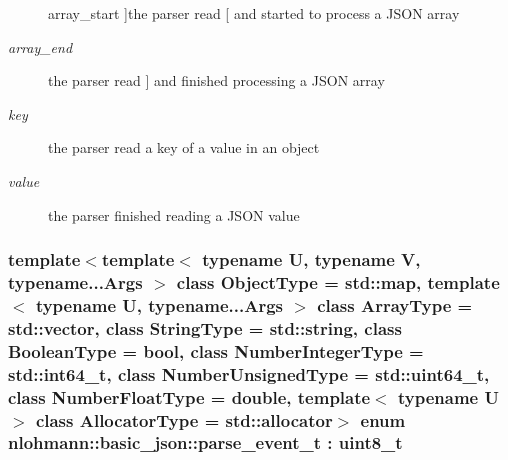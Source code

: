 \begin{Desc}
\begin{description}
{\hypertarget{classnlohmann_1_1basic__json_aea1c863b719b4ca5b77188c171bbfafeaa4388a3d92419edbb1c6efd4d52461f3}{array\-\_\-start}\label{classnlohmann_1_1basic__json_aea1c863b719b4ca5b77188c171bbfafeaa4388a3d92419edbb1c6efd4d52461f3}
}]the parser read {\ttfamily \mbox{[}} and started to process a J\-S\-O\-N array \item[{\em 
\hypertarget{classnlohmann_1_1basic__json_aea1c863b719b4ca5b77188c171bbfafea49642fb732aa2e112188fba1f9d3ef7f}{array\-\_\-end}\label{classnlohmann_1_1basic__json_aea1c863b719b4ca5b77188c171bbfafea49642fb732aa2e112188fba1f9d3ef7f}
}]the parser read {\ttfamily \mbox{]}} and finished processing a J\-S\-O\-N array \item[{\em 
\hypertarget{classnlohmann_1_1basic__json_aea1c863b719b4ca5b77188c171bbfafea3c6e0b8a9c15224a8228b9a98ca1531d}{key}\label{classnlohmann_1_1basic__json_aea1c863b719b4ca5b77188c171bbfafea3c6e0b8a9c15224a8228b9a98ca1531d}
}]the parser read a key of a value in an object \item[{\em 
\hypertarget{classnlohmann_1_1basic__json_aea1c863b719b4ca5b77188c171bbfafea2063c1608d6e0baf80249c42e2be5804}{value}\label{classnlohmann_1_1basic__json_aea1c863b719b4ca5b77188c171bbfafea2063c1608d6e0baf80249c42e2be5804}
}]the parser finished reading a J\-S\-O\-N value \end{description}
\end{Desc}
\hypertarget{classnlohmann_1_1basic__json_aea1c863b719b4ca5b77188c171bbfafe}{
\subsubsection[{parse\-\_\-event\-\_\-t}]{\setlength{\rightskip}{0pt plus 5cm}template$<$template$<$ typename U, typename V, typename...\-Args $>$ class Object\-Type = std\-::map, template$<$ typename U, typename...\-Args $>$ class Array\-Type = std\-::vector, class String\-Type  = std\-::string, class Boolean\-Type  = bool, class Number\-Integer\-Type  = std\-::int64\-\_\-t, class Number\-Unsigned\-Type  = std\-::uint64\-\_\-t, class Number\-Float\-Type  = double, template$<$ typename U $>$ class Allocator\-Type = std\-::allocator$>$ enum {\bf nlohmann\-::basic\-\_\-json\-::parse\-\_\-event\-\_\-t} \-: uint8\-\_\-t\hspace{0.3cm}{\ttfamily [strong]}}}\label{classnlohmann_1_1basic__json_aea1c863b719b4ca5b77188c171bbfafe}


